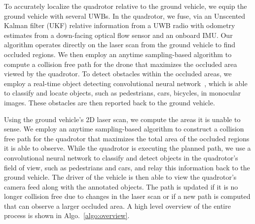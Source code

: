 
To accurately localize the quadrotor relative to the ground vehicle, we equip the ground vehicle with several UWBs. In the quadrotor, we fuse, via an Unscented Kalman filter (UKF) relative information from a UWB radio with odometry estimates from a down-facing optical flow sensor and an onboard IMU.
Our algorithm operates directly on the laser scan from the ground vehicle to find occluded
regions.
We then employ an anytime sampling-based algorithm to compute a collision free path for the drone
that maximizes the occluded area viewed by the quadrotor.
To detect obstacles within the occluded areas, we employ a real-time object
detecting convolutional neural network~\cite{redmon2016you}, which is able to
classify and locate objects, such as pedestrians, cars, bicycles, in monocular
images.  These obstacles are then reported back to the ground vehicle.

%
%

Using the ground vehicle's 2D laser scan, we compute the areas it is unable to
sense. We employ an anytime sampling-based algorithm to construct a collision free 
path for the quadrotor that maximizes the total area of the occluded
regions it is able to observe. While the quadrotor is executing the planned
path, we use a convolutional neural network to classify and detect objects in
the quadrotor's field of view, such as pedestrians and cars, and relay this
information back to the ground vehicle. The driver of the vehicle is then able
to view the quadrotor's camera feed along with the annotated objects. The path
is updated if it is no longer collision free due to changes in the laser scan
or if a new path is computed that can observe a larger occluded area. A high
level overview of the entire process is shown in Algo.~\ref{algo:overview}.

